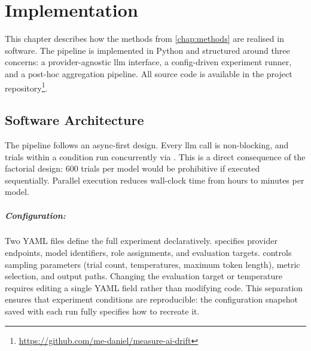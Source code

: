 \chapter{Implementation}
\label{chap:implementation}


This chapter describes how the methods from \autoref{chap:methods} are
realised in software. The pipeline is implemented in Python and structured
around three concerns: a provider-agnostic \gls{llm} interface, a
config-driven experiment runner, and a post-hoc aggregation pipeline. All source code is available in the project
repository\footnote{\url{https://github.com/me-daniel/measure-ai-drift}}.


\section{Software Architecture}
\label{sec:impl-architecture}

The pipeline follows an async-first design. Every \gls{llm} call is
non-blocking, and trials within a condition run concurrently via
. This is a direct consequence of the factorial
design: 600 trials per model would be prohibitive if executed sequentially.
Parallel execution reduces wall-clock time from hours to minutes per model.

\paragraph{Configuration:}
Two YAML files define the full experiment declaratively.
 specifies provider endpoints, model identifiers, role
assignments, and evaluation targets.  controls
sampling parameters (trial count, temperatures, maximum token length),
metric selection, and output paths. Changing the evaluation target or
temperature requires editing a single YAML field rather than modifying
code. This separation ensures that experiment conditions are reproducible:
the configuration snapshot saved with each run fully specifies how to
recreate it.

